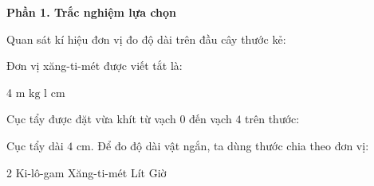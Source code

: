 \textbf{Phần 1. Trắc nghiệm lựa chọn}


\begin{ex} %
Quan sát kí hiệu đơn vị đo độ dài trên đầu cây thước kẻ:
\begin{center}\vspace{-2.5mm}
\vspace{-2.5mm}\end{center}
Đơn vị xăng-ti-mét được viết tắt là:
\begin{multicols}{4}
\choice
{$\text{m}$}
{$\text{kg}$}
{$\text{l}$}
{\True $\text{cm}$}
\end{multicols}
\end{ex}

\begin{ex} %
Cục tẩy được đặt vừa khít từ vạch $0$ đến vạch $4$ trên thước:
\begin{center}\vspace{-2.5mm}
\vspace{-2.5mm}\end{center}
Cục tẩy dài $4\text{ cm}$. Để đo độ dài vật ngắn, ta dùng thước chia theo đơn vị:
\begin{multicols}{2}
\choice
{Ki-lô-gam}
{\True Xăng-ti-mét}
{Lít}
{Giờ}
\end{multicols}
\end{ex}

